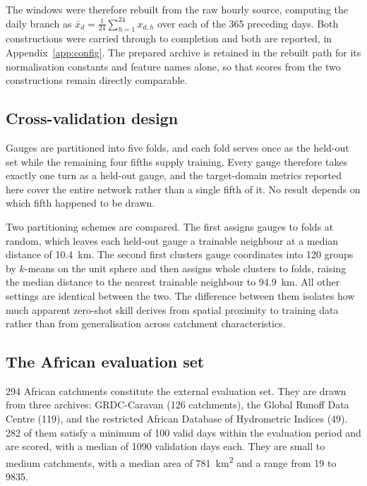 \documentclass[11pt,a4paper]{article}
\begin{document}
The windows were therefore rebuilt from the raw hourly source, computing the daily branch as
$\bar{x}_d = \frac{1}{24}\sum_{h=1}^{24} x_{d,h}$ over each of the \num{365} preceding days.
Both constructions were carried through to completion and both are reported, in
Appendix~\ref{app:config}. The prepared archive is retained in the rebuilt path for its
normalisation constants and feature names alone, so that scores from the two constructions
remain directly comparable.

\subsection{Cross-validation design}

Gauges are partitioned into five folds, and each fold serves once as the held-out set while
the remaining four fifths supply training. Every gauge therefore takes exactly one turn as a
held-out gauge, and the target-domain metrics reported here cover the entire network rather
than a single fifth of it. No result depends on which fifth happened to be drawn.

Two partitioning schemes are compared. The first assigns gauges to folds at random, which
leaves each held-out gauge a trainable neighbour at a median distance of \SI{10.4}{\km}. The
second first clusters gauge coordinates into \num{120} groups by $k$-means on the unit sphere
and then assigns whole clusters to folds, raising the median distance to the nearest
trainable neighbour to \SI{94.9}{\km}. All other settings are identical between the two. The
difference between them isolates how much apparent zero-shot skill derives from spatial
proximity to training data rather than from generalisation across catchment characteristics.

\subsection{The African evaluation set}

\num{294} African catchments constitute the external evaluation set. They are drawn from
three archives: GRDC-Caravan (\num{126} catchments), the Global Runoff Data Centre
(\num{119}), and the restricted African Database of Hydrometric Indices (\num{49}).
\num{282} of them satisfy a minimum of \num{100} valid days within the evaluation period and
are scored, with a median of \num{1090} validation days each. They are small to medium
catchments, with a median area of \SI{781}{\km\squared} and a range from \num{19} to
\num{9835}.
\end{document}
